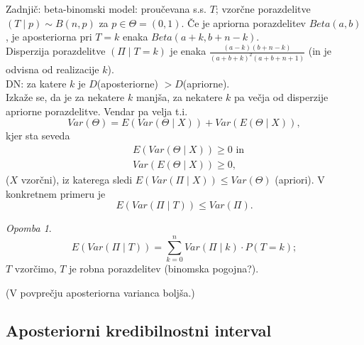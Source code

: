 \documentclass[a4paper, 12pt]{book}
\theoremstyle{definition}
\theoremstyle{remark}
\newtheorem*{rem}{Opomba}
\begin{document}

Zadnjič: beta-binomski model: proučevana s.s. $T$;
vzorčne porazdelitve $(T \mid p) \sim B(n,p)$ za $p \in \Theta = (0,1)$.
Če je apriorna porazdelitev $Beta(a,b)$, je aposteriorna pri $T = k$ enaka $Beta(a+k, b+n-k)$. \\
Disperzija porazdelitve $(\Pi \mid T = k)$ je enaka $\frac{(a-k)(b+n-k)}{(a+b+k)^2(a+b+n+1)}$
(in je odvisna od realizacije $k$). \\
DN: za katere $k$ je $D$(aposteriorne) $> D$(apriorne). \\
Izkaže se, da je za nekatere $k$ manjša, za nekatere $k$ pa večja od disperzije apriorne porazdelitve.
Vendar pa velja t.i. 
\begin{equation*}
  Var(\Theta) = E(Var(\Theta \mid X)) + Var(E(\Theta \mid X)),
\end{equation*}
kjer sta seveda
\begin{align*}
  &E(Var(\Theta \mid X)) \geq 0 \text{ in} \\
  &Var(E(\Theta \mid X)) \geq 0,
\end{align*}
($X$ vzorčni), iz katerega sledi $E(Var(\Pi \mid X)) \leq Var(\Theta)$ (apriori).
V konkretnem primeru je
\begin{equation*}
  E(Var(\Pi \mid T)) \leq Var(\Pi).
\end{equation*}
\begin{rem}
  \begin{equation*}
    E(Var(\Pi \mid T)) = \sum_{k=0}^{n} Var(\Pi \mid k) \cdot P(T = k);
  \end{equation*}
  $T$ vzorčimo, $T$ je robna porazdelitev (binomska pogojna?).
\end{rem}
(V povprečju aposteriorna varianca boljša.)


\subsection{Aposteriorni kredibilnostni interval}
\end{document}
